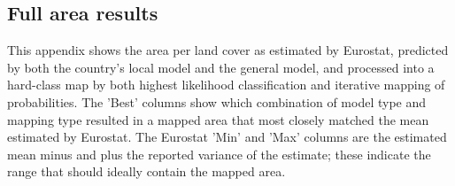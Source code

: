     \subsection*{Full area results}
    \label{appendix:full_area_results}
    This appendix shows the area per land cover as estimated by Eurostat, predicted by both the country's local model and the general model, and processed into a hard-class map by both highest likelihood classification and iterative mapping of probabilities. The 'Best' columns show which combination of model type and mapping type resulted in a mapped area that most closely matched the mean estimated by Eurostat. The Eurostat 'Min' and 'Max' columns are the estimated mean minus and plus the reported variance of the estimate; these indicate the range that should ideally contain the mapped area. 
    
    
    
